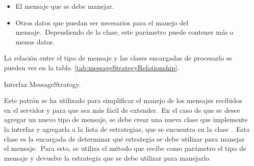 \begin{itemize}
	\item El mensaje que se debe manejar.
	\item Otros datos que puedan ser necesarios para el manejo del mensaje.\ Dependiendo de la clase, este parámetro
	puede contener más o menos datos.
\end{itemize}
\label{itm:parametershandlestrategy}

La relación entre el tipo de mensaje y las clases encargadas de procesarlo se pueden ver en la
tabla~\ref{tab:messageStrategyRelationship}.

\begin{umlDiagram}
	\centering

	\caption{Interfaz MessageStrategy.}
\end{umlDiagram}

Este patrón se ha utilizado para simplificar el manejo de los mensajes recibidos en el servidor y para que sea más
fácil de extender.\ En el caso de que se desee agregar un nuevo tipo de mensaje, se debe crear una nueva clase que
implemente la interfaz  y agregarla a la lista de estrategias, que se encuentra en la
clase .\ Esta clase es la encargada de determinar qué estrategia se debe utilizar para
manejar el mensaje.\ Para esto, se utiliza el método  que
recibe como parámetro el tipo de mensaje y devuelve la estrategia que se debe utilizar para manejarlo.

